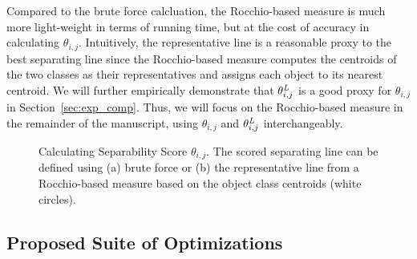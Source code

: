  Compared to the brute force calcluation, the Rocchio-based measure is much more light-weight in terms of running time, but at the cost of accuracy in calculating $\theta_{i,j}$. Intuitively, the representative line is a reasonable proxy to the best separating line since the Rocchio-based measure computes the centroids of the two classes as their representatives and assigns each object to its nearest centroid. We will further empirically demonstrate that $\theta_{i,j}^{\mathit{L}}$ is a good proxy for $\theta_{i,j}$ in Section~\ref{sec:exp_comp}. Thus, we will focus on the Rocchio-based measure in the remainder of the manuscript, using $\theta_{i,j}$ and $\theta_{i,j}^{\mathit{L}}$ interchangeably.


\begin{figure}[h]
\centering %
\vspace{-5mm}
\vspace{-5mm}
\caption{Calculating Separability Score $\theta_{i,j}$. The scored separating line can be defined using (a) brute force or (b) the representative line from a Rocchio-based measure based on the object class centroids (white circles).}
\vspace{-5mm}
\label{fig:metric}
\end{figure}
\subsection{Proposed Suite of Optimizations}\label{sec:opt}

